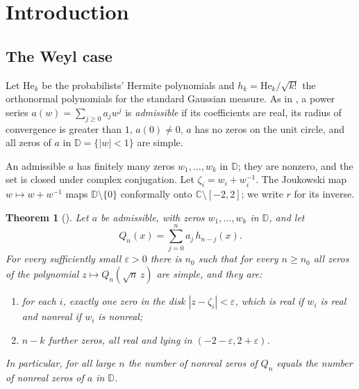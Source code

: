 \documentclass[11pt]{amsart}
\newtheorem{theoremA}{Theorem}
\theoremstyle{definition}
\theoremstyle{remark}
\numberwithin{equation}{section}
\newcommand{\C}{\mathbb{C}}
\newcommand{\D}{\mathbb{D}}
\newcommand{\eps}{\varepsilon}
\newcommand{\He}{\mathrm{He}}
\begin{document}
\maketitle

\section{Introduction}\label{sec:intro}

\subsection{The Weyl case}
Let $\He_k$ be the probabilists' Hermite polynomials and $h_k=\He_k/\sqrt{k!}$ the orthonormal polynomials for the standard Gaussian measure. As in \cite[Definition~\ref{M-def:admissible}]{Main}, a power series $a(w)=\sum_{j\ge0}a_jw^j$ is \emph{admissible} if its coefficients are real, its radius of convergence is greater than $1$, $a(0)\neq0$, $a$ has no zeros on the unit circle, and all zeros of $a$ in $\D=\{|w|<1\}$ are simple.

An admissible $a$ has finitely many zeros $w_1,\dots,w_k$ in $\D$; they are nonzero, and the set is closed under complex conjugation. Let $\zeta_i=w_i+w_i^{-1}$. The Joukowski map $w\mapsto w+w^{-1}$ maps $\D\setminus\{0\}$ conformally onto $\C\setminus[-2,2]$; we write $r$ for its inverse.

\begin{theoremA}[{\cite[Theorem~\ref{M-thm:main}]{Main}}]\label{thm:A}
Let $a$ be admissible, with zeros $w_1,\dots,w_k$ in $\D$, and let
\[
Q_n(x)=\sum_{j=0}^{n}a_j\,h_{n-j}(x).
\]
For every sufficiently small $\eps>0$ there is $n_0$ such that for every $n\ge n_0$ all zeros of the polynomial $z\mapsto Q_n(\sqrt n\,z)$ are simple, and they are:
\begin{enumerate}
\item[(a)] for each $i$, exactly one zero in the disk $|z-\zeta_i|<\eps$, which is real if $w_i$ is real and nonreal if $w_i$ is nonreal;
\item[(b)] $n-k$ further zeros, all real and lying in $(-2-\eps,2+\eps)$.
\end{enumerate}
In particular, for all large $n$ the number of nonreal zeros of $Q_n$ equals the number of nonreal zeros of $a$ in $\D$.
\end{theoremA}
\end{document}
